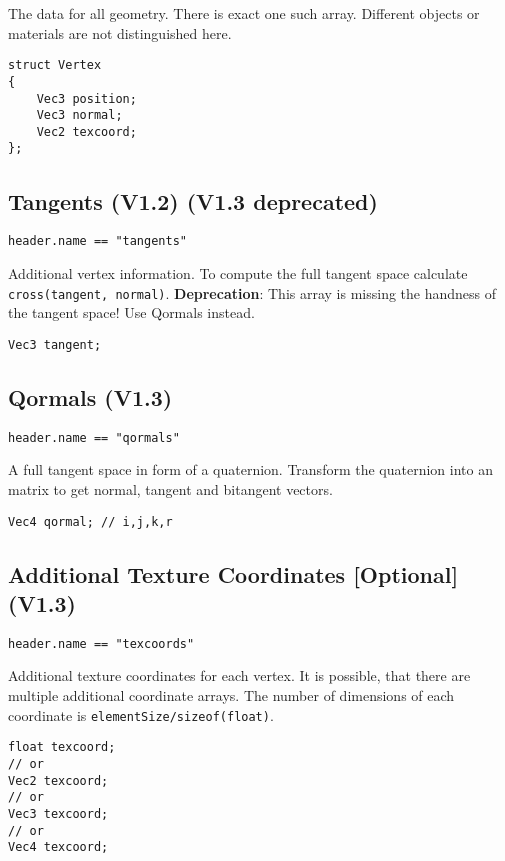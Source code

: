 \documentclass[english,10pt,a4paper,twocolumn,colorscheme=green]{orarticle}
\begin{document}
	The data for all geometry. There is exact one such array. Different objects
	or materials are not distinguished here.
	\begin{lstlisting}
struct Vertex
{
	Vec3 position;
	Vec3 normal;
	Vec2 texcoord;
};
	\end{lstlisting}
	
	\subsection{Tangents (V1.2) (V1.3 deprecated)}
	\lstinline|header.name == "tangents"|
	
	Additional vertex information. To compute the full tangent space calculate \lstinline|cross(tangent, normal)|.
	\textbf{Deprecation}: This array is missing the handness of the tangent space! Use Qormals instead.
	\begin{lstlisting}
Vec3 tangent;
	\end{lstlisting}
	
	\subsection{Qormals (V1.3)}
	\lstinline|header.name == "qormals"|
	
	A full tangent space in form of a quaternion. Transform the quaternion into an matrix to get normal, tangent and bitangent vectors.
	\begin{lstlisting}
Vec4 qormal; // i,j,k,r
	\end{lstlisting}
	
	\subsection{Additional Texture Coordinates [Optional] (V1.3)}
	\lstinline|header.name == "texcoords"|
	
	Additional texture coordinates for each vertex. It is possible, that there are multiple additional coordinate arrays. The number of dimensions of each coordinate is \lstinline|elementSize/sizeof(float)|.
	\begin{lstlisting}
float texcoord;
// or
Vec2 texcoord;
// or
Vec3 texcoord;
// or
Vec4 texcoord;
	\end{lstlisting}		
\end{document}
